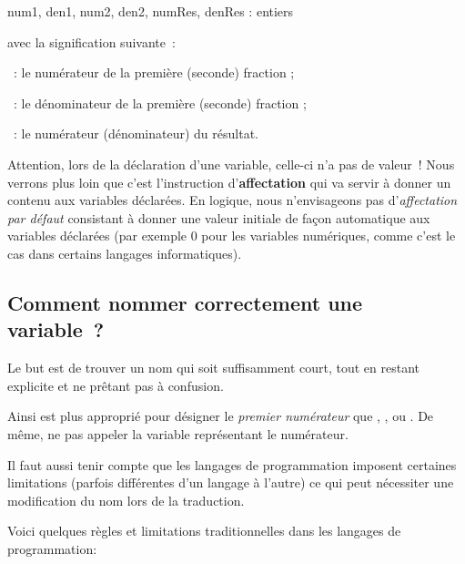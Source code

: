 			\begin{Pseudocode}
				\Decl num1, den1, num2, den2, numRes, denRes : entiers
			\end{Pseudocode}

			avec la signification suivante~:

			\begin{liste}
			\item
				~: 
					le numérateur de la première (seconde) fraction ;
			\item
				~: 
					le dénominateur de la première (seconde) fraction ;
			\item
				~: 
					le numérateur (dénominateur) du résultat.
			\end{liste}
			
			Attention, lors de la déclaration d’une variable, celle-ci n’a pas de
			valeur~! Nous verrons plus loin que c’est l’instruction
			d’\textbf{affectation} qui va servir à donner un contenu aux variables
			déclarées. En logique, nous n’envisageons pas d’\textit{affectation par
			défaut} consistant à donner une valeur initiale de façon automatique
			aux variables déclarées (par exemple 0 pour les variables numériques,
			comme c’est le cas dans certains langages informatiques).

		\subsection{Comment nommer correctement une variable~?}

			Le but est de trouver un nom qui soit suffisamment court,
			tout en restant explicite et ne prêtant pas à confusion.
			
			Ainsi  est plus approprié pour
			désigner le \textit{premier numérateur} que 
			, , 
			ou .
			De même, ne pas appeler  
			la variable représentant le numérateur.
			
			Il faut aussi tenir compte que les
			langages de programmation imposent certaines limitations 
			(parfois différentes d’un langage à l’autre)
			ce qui peut nécessiter une modification du nom lors de la traduction.

			Voici quelques règles et limitations traditionnelles dans les langages
			de programmation:

